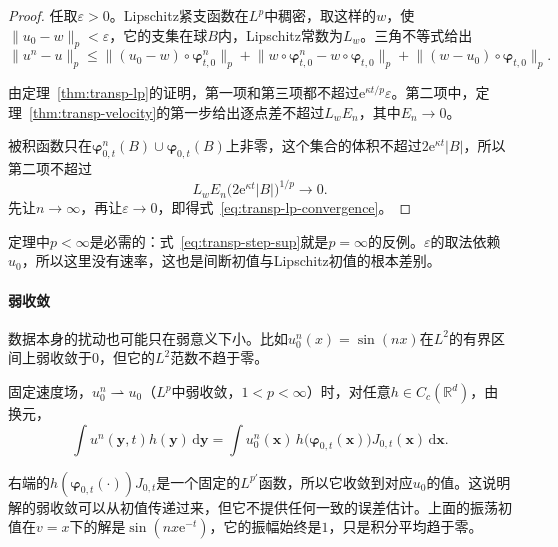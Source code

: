 \begin{proof}
任取$\varepsilon>0$。Lipschitz紧支函数在$L^{p}$中稠密，取这样的$w$，使$\lVert u_0-w\rVert_{p}<\varepsilon$，它的支集在球$B$内，Lipschitz常数为$L_w$。三角不等式给出
\[
  \lVert u^{n}-u\rVert_{p}\leq\lVert(u_0-w)\circ\bm{\varphi}^{n}_{t,0}\rVert_{p}
  +\lVert w\circ\bm{\varphi}^{n}_{t,0}-w\circ\bm{\varphi}_{t,0}\rVert_{p}
  +\lVert(w-u_0)\circ\bm{\varphi}_{t,0}\rVert_{p}.
\]

由定理~\ref{thm:transp-lp}的证明，第一项和第三项都不超过$\mathrm{e}^{\kappa t/p}\varepsilon$。第二项中，定理~\ref{thm:transp-velocity}的第一步给出逐点差不超过$L_wE_n$，其中$E_n\to0$。

被积函数只在$\bm{\varphi}^{n}_{0,t}(B)\cup\bm{\varphi}_{0,t}(B)$上非零，这个集合的体积不超过$2\mathrm{e}^{\kappa t}\lvert B\rvert$，所以第二项不超过
\[
  L_wE_n\bigl(2\mathrm{e}^{\kappa t}\lvert B\rvert\bigr)^{1/p}\to0.
\]
先让$n\to\infty$，再让$\varepsilon\to0$，即得式~\eqref{eq:transp-lp-convergence}。
\end{proof}

定理中$p<\infty$是必需的：式~\eqref{eq:transp-step-sup}就是$p=\infty$的反例。$\varepsilon$的取法依赖$u_0$，所以这里没有速率，这也是间断初值与Lipschitz初值的根本差别。

\paragraph{弱收敛}
数据本身的扰动也可能只在弱意义下小。比如$u_0^{n}(x)=\sin(nx)$在$L^{2}$的有界区间上弱收敛于$0$，但它的$L^{2}$范数不趋于零。

固定速度场，$u_0^{n}\rightharpoonup u_0$（$L^{p}$中弱收敛，$1<p<\infty$）时，对任意$h\in C_c(\mathbb{R}^{d})$，由换元，
\[
  \int u^{n}(\bm{y},t)h(\bm{y})\,\mathrm{d}\bm{y}
  =\int u_0^{n}(\bm{x})\,h\bigl(\bm{\varphi}_{0,t}(\bm{x})\bigr)J_{0,t}(\bm{x})\,\mathrm{d}\bm{x}.
\]

右端的$h(\bm{\varphi}_{0,t}(\cdot))J_{0,t}$是一个固定的$L^{p'}$函数，所以它收敛到对应$u_0$的值。这说明解的弱收敛可以从初值传递过来，但它不提供任何一致的误差估计。上面的振荡初值在$v=x$下的解是$\sin(nx\mathrm{e}^{-t})$，它的振幅始终是$1$，只是积分平均趋于零。
